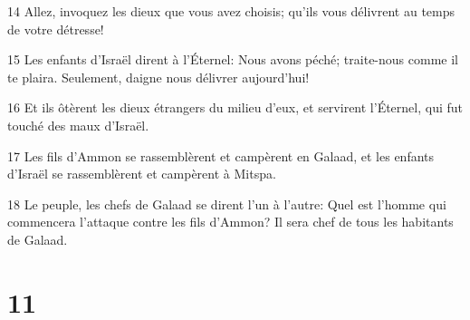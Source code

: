 \par 14 Allez, invoquez les dieux que vous avez choisis; qu'ils vous délivrent au temps de votre détresse!
\par 15 Les enfants d'Israël dirent à l'Éternel: Nous avons péché; traite-nous comme il te plaira. Seulement, daigne nous délivrer aujourd'hui!
\par 16 Et ils ôtèrent les dieux étrangers du milieu d'eux, et servirent l'Éternel, qui fut touché des maux d'Israël.
\par 17 Les fils d'Ammon se rassemblèrent et campèrent en Galaad, et les enfants d'Israël se rassemblèrent et campèrent à Mitspa.
\par 18 Le peuple, les chefs de Galaad se dirent l'un à l'autre: Quel est l'homme qui commencera l'attaque contre les fils d'Ammon? Il sera chef de tous les habitants de Galaad.

\chapter{11}

